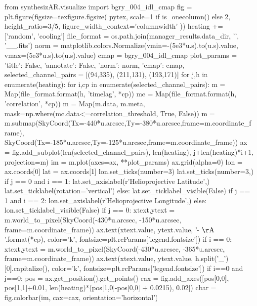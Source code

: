 \begin{pycode}
from synthesizAR.visualize import bgry_004_idl_cmap
fig = plt.figure(figsize=texfigure.figsize(
    pytex,
    scale=1 if is_onecolumn() else 2,
    height_ratio=3/5,
    figure_width_context='columnwidth'
))
heating += ['random', 'cooling']
file_format = os.path.join(manager_results.data_dir, '{}', '{}_{}_{}.fits')
norm = matplotlib.colors.Normalize(vmin=-(5e3*u.s).to(u.s).value,
                                   vmax=(5e3*u.s).to(u.s).value)
cmap = bgry_004_idl_cmap
plot_params = {'title': False, 'annotate': False, 'norm': norm, 'cmap': cmap,}
selected_channel_pairs = [(94,335), (211,131), (193,171)]
for j,h in enumerate(heating):
    for i,cp in enumerate(selected_channel_pairs):
        m = Map(file_format.format(h, 'timelag', *cp))
        mc = Map(file_format.format(h, 'correlation', *cp))
        m = Map(m.data, m.meta, mask=np.where(mc.data<=correlation_threshold, True, False))
        m = m.submap(SkyCoord(Tx=-440*u.arcsec,Ty=-380*u.arcsec,frame=m.coordinate_frame),
                     SkyCoord(Tx=-185*u.arcsec,Ty=-125*u.arcsec,frame=m.coordinate_frame))
        ax = fig.add_subplot(len(selected_channel_pairs), len(heating), j+len(heating)*i+1,
                             projection=m)
        im = m.plot(axes=ax, **plot_params)
        ax.grid(alpha=0)
        lon = ax.coords[0]
        lat = ax.coords[1]
        lon.set_ticks(number=3)
        lat.set_ticks(number=3,) 
        if j == 0 and i == 1:
            lat.set_axislabel(r'Helioprojective Latitude',)
            lat.set_ticklabel(rotation='vertical')
        else:
            lat.set_ticklabel_visible(False)
        if j == 1 and i == 2:
            lon.set_axislabel(r'Helioprojective Longitude',)
        else:
            lon.set_ticklabel_visible(False)
        if j == 0:
            xtext,ytext = m.world_to_pixel(SkyCoord(-430*u.arcsec, -150*u.arcsec, frame=m.coordinate_frame))
            ax.text(xtext.value, ytext.value, '{}-{} $\mathrm{{\AA}}$'.format(*cp),
                    color='k', fontsize=plt.rcParams['legend.fontsize'])
        if i == 0:
            xtext,ytext = m.world_to_pixel(SkyCoord(-430*u.arcsec, -365*u.arcsec, frame=m.coordinate_frame))
            ax.text(xtext.value, ytext.value, h.split('_')[0].capitalize(),
                color='k', fontsize=plt.rcParams['legend.fontsize'])
        if i==0 and j==0:
            pos = ax.get_position().get_points()
            cax = fig.add_axes([pos[0,0], pos[1,1]+0.01, len(heating)*(pos[1,0]-pos[0,0] + 0.0215), 0.02])
            cbar = fig.colorbar(im, cax=cax, orientation='horizontal')

\end{pycode}
